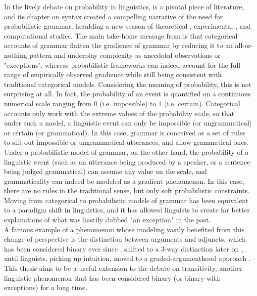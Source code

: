 In the lively debate on probability in linguistics, \textcite{bod2003probabilistic} is a pivotal piece of literature, and its chapter on syntax \parencite{manning2003probabilistic} created a compelling narrative of the need for probabilistic grammar, heralding a new season of theoretical \parencite{wasow2007gradient, CrockerKeller2006}, experimental \parencite{KellerSorace2003, bresnan2007probabilistic, BresnanHay2008, SoraceKeller2005, AlexopoulouKeller2006}, and computational \parencite{TurneyPantel2010} studies. The main take-home message from \textcite{manning2003probabilistic} is that categorical accounts of grammar flatten the gradience of grammar by reducing it to an all-or-nothing pattern and underplay complexity as anecdotal observations or "exceptions", whereas probabilistic frameworks can indeed account for the full range of empirically observed gradience while still being consistent with traditional categorical models. Considering the meaning of probability, this is not surprising at all. In fact, the probability of an event is quantified on a continuous numerical scale ranging from 0 (i.e. impossible) to 1 (i.e. certain). Categorical accounts only work with the extreme values of the probability scale, so that under such a model, a linguistic event can only be impossible (or ungrammatical) or certain (or grammatical). In this case, grammar is conceived as a set of rules to sift out impossible or ungrammatical utterances, and allow grammatical ones. Under a probabilistic model of grammar, on the other hand, the probability of a linguistic event (such as an utterance being produced by a speaker, or a sentence being judged grammatical) can assume any value on the scale, and grammaticality can indeed be modeled as a gradient phenomenon. In this case, there are no rules in the traditional sense, but only soft probabilistic constraints. Moving from categorical to probabilistic models of grammar has been equivalent to a paradigm shift in linguistics, and it has allowed linguists to create far better explanations of what was hastily dubbed "an exception" in the past.\\
A famous example of a phenomenon whose modeling vastly benefited from this change of perspective is the distinction between arguments and adjuncts, which has been considered binary ever since \textcite{tesniere2015elements}, shifted to a 3-way distinction later on \parencite{vanvalinlapolla1997syntax, Dowty2003, AldezabalEtAl2002, Villavicencio2002}, until linguists, picking up  intuition, moved to a graded-argumenthood approach \parencite{CennamoLenci2019, KimEtAl2019, KimEtAl2019a, KimEtAl2018}. This thesis aims to be a useful extension to the debate on transitivity, another linguistic phenomenon that has been considered binary (or binary-with-exceptions) for a long time.
